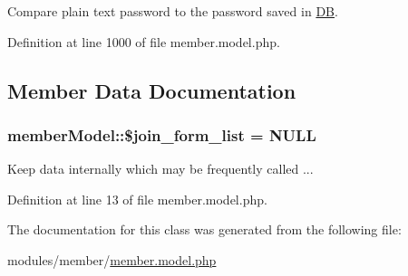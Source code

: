 Compare plain text password to the password saved in \hyperlink{classDB}{D\+B}. 



Definition at line 1000 of file member.\+model.\+php.



\subsection{Member Data Documentation}
\hypertarget{classmemberModel_aa9b942e17ed74955c8700dd74d75d2b2}{}
\subsubsection[{\$join\+\_\+form\+\_\+list}]{\setlength{\rightskip}{0pt plus 5cm}member\+Model\+::\$join\+\_\+form\+\_\+list = N\+U\+L\+L}\label{classmemberModel_aa9b942e17ed74955c8700dd74d75d2b2}


Keep data internally which may be frequently called ... 



Definition at line 13 of file member.\+model.\+php.



The documentation for this class was generated from the following file\+:\begin{DoxyCompactItemize}
\item 
modules/member/\hyperlink{member_8model_8php}{member.\+model.\+php}\end{DoxyCompactItemize}

